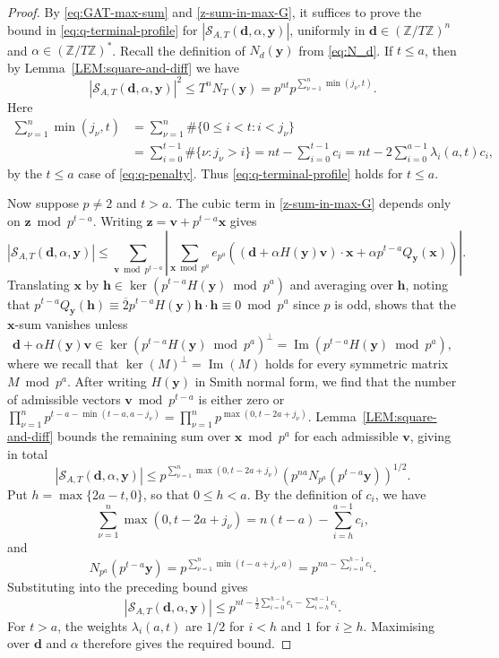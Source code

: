 \documentclass[a4paper,11pt, twoside,reqno]{amsart}
\theoremstyle{plain}
\theoremstyle{definition}
\theoremstyle{remark}
\newcommand{\bfh}{\bm{h}}
\newcommand{\bfv}{\bm{v}}
\newcommand{\bfx}{\bm{x}}
\newcommand{\bfy}{\bm{y}}
\newcommand{\bfz}{\bm{z}}
\newcommand{\bfd}{\bm{d}}
\newcommand{\ZZ}{\mathbb{Z}}
\DeclareMathOperator{\im}{Im}
\renewcommand{\bar}{\overline}
\renewcommand{\le}{\leqslant}
\renewcommand{\leq}{\leqslant}
\renewcommand{\geq}{\geqslant}
\numberwithin{equation}{section}
\begin{document}
\begin{proof}
By \eqref{eq:GAT-max-sum} and \eqref{z-sum-in-max-G},
it suffices to prove the bound in \eqref{eq:q-terminal-profile}
for $|\mathcal S_{A,T}(\bfd,\alpha,\bfy)|$, uniformly in
$\bfd\in(\ZZ/T\ZZ)^n$ and
$\alpha\in(\ZZ/T\ZZ)^\ast$.
Recall the definition of $N_d(\bfy)$ from \eqref{eq:N_d}.
If $t\le a$, then by Lemma~\ref{LEM:square-and-diff} we have
\begin{equation*}
|\mathcal{S}_{A,T}(\bfd,\alpha,\bfy)|^2
\le T^n N_T(\bfy)
= p^{nt} p^{\sum_{\nu=1}^{n} \min(j_\nu,t)}.
\end{equation*}
Here
\begin{equation*}
\begin{split}
\sum_{\nu=1}^{n} \min(j_\nu,t)
&= \sum_{\nu=1}^{n} \#\{0\le i<t: i<j_\nu\} \\
&= \sum_{i=0}^{t-1} \#\{\nu:j_\nu>i\}
= nt - \sum_{i=0}^{t-1}c_i
= nt - 2\sum_{i=0}^{a-1}\lambda_i(a,t)c_i,
\end{split}
\end{equation*}
by the $t\le a$ case of \eqref{eq:q-penalty}.
Thus \eqref{eq:q-terminal-profile} holds for $t\le a$.

Now suppose $p\ne 2$ and $t>a$.
The cubic term in \eqref{z-sum-in-max-G}
depends only on $\bfz\bmod{p^{t-a}}$.
Writing $\bfz=\bfv+p^{t-a}\bfx$ gives
\begin{equation*}
|\mathcal{S}_{A,T}(\bfd,\alpha,\bfy)|
\le \sum_{\bfv\bmod p^{t-a}}
\left|\sum_{\bfx\bmod p^a}
e_{p^a}((\bfd+\alpha H(\bfy)\bfv)\cdot\bfx+\alpha p^{t-a}Q_{\bfy}(\bfx))\right|.
\end{equation*}
Translating $\bfx$ by $\bfh\in \ker(p^{t-a}H(\bfy)\bmod{p^a})$
and averaging over $\bfh$,
noting that $p^{t-a}Q_{\bfy}(\bfh)
\equiv \bar{2}p^{t-a}H(\bfy)\bfh\cdot \bfh
\equiv 0 \bmod{p^a}$
since $p$ is odd, shows that the $\bfx$-sum vanishes
unless $$\bfd+\alpha H(\bfy)\bfv
\in \ker(p^{t-a}H(\bfy)\bmod{p^a})^\perp
= \im(p^{t-a}H(\bfy)\bmod{p^a}),$$
where we recall that $\ker(M)^\perp = \im(M)$
holds for every symmetric matrix $M\bmod{p^a}$.
After writing $H(\bfy)$ in Smith normal form,
we find that the number of admissible vectors $\bfv\bmod{p^{t-a}}$ is either zero
or $\prod_{\nu=1}^{n} p^{t-a - \min(t-a,a-j_\nu)}
= \prod_{\nu=1}^{n} p^{\max(0,t-2a+j_\nu)}$.
Lemma~\ref{LEM:square-and-diff} bounds
the remaining sum over $\bfx\bmod{p^a}$
for each admissible $\bfv$, giving in total
\begin{equation*}
|\mathcal{S}_{A,T}(\bfd,\alpha,\bfy)|
\le p^{\sum_{\nu=1}^{n} \max(0,t-2a+j_\nu)}
(p^{na} N_{p^a}(p^{t-a}\bfy))^{1/2}.
\end{equation*}
Put $h=\max\{2a-t,0\}$, so that $0\leq h<a$. By the
definition of $c_i$, we have
\[
\sum_{\nu=1}^n\max(0,t-2a+j_\nu)
=n(t-a)-\sum_{i=h}^{a-1}c_i,
\]
and
\[
N_{p^a}(p^{t-a}\bfy)
=p^{\sum_{\nu=1}^n\min(t-a+j_\nu,a)}
=p^{na-\sum_{i=0}^{h-1}c_i}.
\]
Substituting into the preceding bound gives
\[
|\mathcal S_{A,T}(\bfd,\alpha,\bfy)|
\leq
p^{nt-\frac12\sum_{i=0}^{h-1}c_i-\sum_{i=h}^{a-1}c_i}.
\]
For $t>a$, the weights $\lambda_i(a,t)$ are $1/2$ for
$i<h$ and $1$ for $i\geq h$. Maximising over $\bfd$ and
$\alpha$ therefore gives the required bound.
\end{proof}
\end{document}

